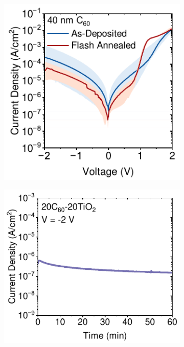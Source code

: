\begin{figure}[htbp]
    \centering
    \begin{subfigure}[t]{0.4\textwidth} %
        \centering
        \includegraphics[width=\textwidth]{chapters/material_properties/images/C60-Compare.pdf} %
        \caption{}
        \label{}
    \end{subfigure}
    \hspace{1cm}
    \begin{subfigure}[t]{0.45\textwidth} %
        \centering
        \includegraphics[width=\textwidth]{chapters/transport_layers/images/JV_1hr_20_20.pdf} %
        \caption{}        
        \label{}
    \end{subfigure}


\end{figure}
